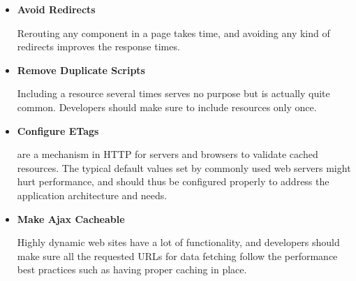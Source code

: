 \begin{itemize}
\item \textbf{Avoid Redirects}

  Rerouting any component in a page takes time, and avoiding any kind
  of redirects improves the response times.

\item \textbf{Remove Duplicate Scripts}

  Including a resource several times serves no purpose but is actually
  quite common. Developers should make sure to include resources only
  once.

\item \textbf{Configure ETags}

   are a mechanism in HTTP for servers and browsers to
  validate cached resources. The typical default values set by
  commonly used web servers might hurt performance, and should thus be
  configured properly to address the application architecture and
  needs.

\item \textbf{Make Ajax Cacheable}

  Highly dynamic web sites have a lot of 
  \cite{garrett2005ajax} functionality, and developers should make
  sure all the requested URLs for data fetching follow the performance
  best practices such as having proper caching in place.

\end{itemize}


